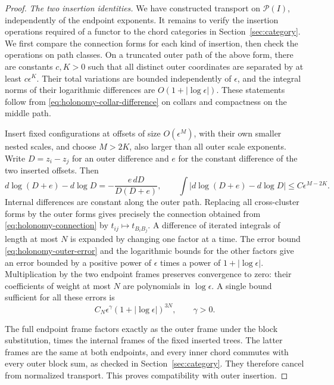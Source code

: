 \documentclass[11pt]{article}
\theoremstyle{definition}
\theoremstyle{remark}
\numberwithin{equation}{section}
\begin{document}
\begin{proof}
\emph{The two insertion identities.}
We have constructed transport on $\mathcal P(I)$, independently of
the endpoint exponents.  It remains to verify the insertion operations
required of a functor to the chord categories in
Section~\ref{sec:category}.  We first compare the connection forms for
each kind of insertion, then check the operations on path classes.
On a truncated
outer path of the above form, there are constants $c,K>0$ such that
all distinct outer coordinates are separated by at least
$c\epsilon^K$.  Their total variations are bounded independently of
$\epsilon$, and the integral norms of their logarithmic differences
are $O(1+|\log\epsilon|)$.  These statements follow from
\eqref{eq:holonomy-collar-difference} on collars and compactness on
the middle path.

Insert fixed configurations at offsets of size $O(\epsilon^M)$,
with their own smaller nested scales, and choose $M>2K$, also larger
than all outer scale exponents.  Write $D=z_i-z_j$ for an outer
difference and $e$ for the constant difference of the two inserted
offsets.  Then
\begin{equation}\label{eq:holonomy-outer-error}
 d\log(D+e)-d\log D
 =-\frac{e\,dD}{D(D+e)},
 \qquad
 \int\left|d\log(D+e)-d\log D\right|
 \leq C\epsilon^{M-2K}.
\end{equation}
Internal differences are constant along the outer path.  Replacing
all cross-cluster forms by the outer forms gives precisely the
connection obtained from \eqref{eq:holonomy-connection} by
$t_{ij}\mapsto t_{B_iB_j}$.  A difference of iterated integrals of
length at most $N$ is expanded by changing one factor at a time.
The error bound \eqref{eq:holonomy-outer-error} and the logarithmic
bounds for the other factors give an error bounded by a positive
power of $\epsilon$ times a power of $1+|\log\epsilon|$.
Multiplication by the two endpoint frames preserves convergence to
zero: their coefficients of weight at most $N$ are polynomials in
$\log\epsilon$.  A single bound sufficient for all these errors is
\begin{equation}\label{eq:holonomy-insertion-bound}
 C_N\epsilon^\gamma(1+|\log\epsilon|)^{3N},\qquad \gamma>0.
\end{equation}

The full endpoint frame factors exactly as the outer frame under the
block substitution, times the internal frames of the fixed inserted
trees.  The latter frames are the same at both endpoints, and every
inner chord commutes with every outer block sum, as checked in
Section~\ref{sec:category}.  They therefore cancel from normalized
transport.  This proves compatibility with outer insertion.


\end{proof}
\end{document}
